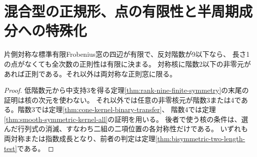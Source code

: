 \section{混合型の正規形、点の有限性と半周期成分への特殊化}
\label{sec:mixed-point-orbits}
\begin{corollary}\label{cor:all-defective-one-sym-finite}
片側対称な標準有限Frobenius窓の四辺が有限で、反対階数が9以下なら、
長さ1の点がなくても全次数の正則性は有限に決まる。
対称核に階数2以下の非零元があれば正則である。それ以外は両対称な正則窓に限る。
\end{corollary}
\begin{proof}
低階数元から中支持3を得る定理\ref{thm:rank-nine-finite-symmetry}の末尾の証明は核の次元を使わない。
それ以外では任意の非零核元が階数3または4である。階数3では定理\ref{thm:cone-kernel-binary-transfer}、
階数4では定理\ref{thm:smooth-symmetric-kernel-all}の証明を用いる。
後者で使う核の条件は、選んだ行列式の消滅、すなわち二組の二項位置の各対称性だけである。
いずれも両対称または指数成長となり、前者の判定は定理\ref{thm:bisymmetric-two-length-test}である。
\end{proof}

